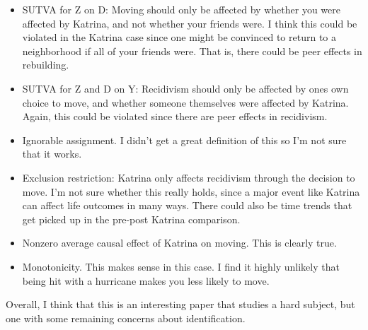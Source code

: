 \documentclass[12 pt, leqno]{article}
\begin{document}
\begin{itemize}
\item SUTVA for Z on D: Moving should only be affected by whether you were affected by Katrina, and not whether your friends were. I think this could be violated in the Katrina case since one might be convinced to return to a neighborhood if all of your friends were. That is, there could be peer effects in rebuilding.

\item SUTVA for Z and D on Y: Recidivism should only be affected by ones own choice to move, and whether someone themselves were affected by Katrina. Again, this could be violated since there are peer effects in recidivism.

\item Ignorable assignment. I didn't get a great definition of this so I'm not sure that it works.

\item Exclusion restriction: Katrina only affects recidivism through the decision to move. I'm not sure whether this really holds, since a major event like Katrina can affect life outcomes in many ways. There could also be time trends that get picked up in the pre-post Katrina comparison.

\item Nonzero average causal effect of Katrina on moving. This is clearly true.

\item Monotonicity. This makes sense in this case. I find it highly unlikely that being hit with a hurricane makes you less likely to move.
\end{itemize}

Overall, I think that this is an interesting paper that studies a hard subject, but one with some remaining concerns about identification. 
\end{document}
